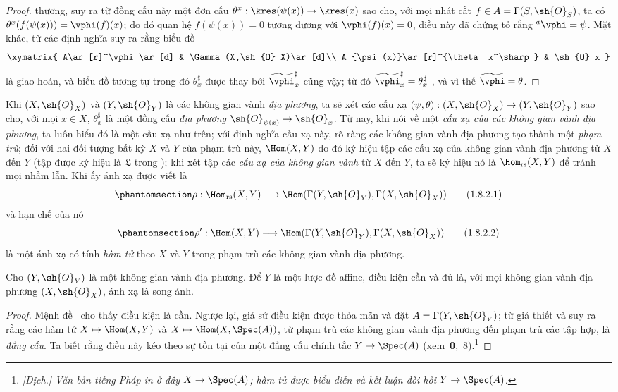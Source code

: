 \documentclass[oneside]{amsart}
\makeatletter
\newcommand{\ega@arrow}[2]{\mathchoice{#1}{#2}{#2}{#2}}
\let\ega@shortmapsto\mapsto
\renewcommand{\to}{\ega@arrow{\longrightarrow}{\rightarrow}}
\renewcommand{\mapsto}{\ega@arrow{\longmapsto}{\ega@shortmapsto}}
\newcommand{\oldpage}[2][]{{\marginnote{\normalfont\textbf{#1}~|~#2}}\ignorespaces}
\let\EGAOriginalLabel\label
\renewcommand{\label}[1]{\phantomsection\EGAOriginalLabel{#1}}
\makeatother
\begin{document}
\begin{proof}
thương, suy ra từ đồng cấu này một đơn cấu
$\theta^x:\kres(\psi(x))\to\kres(x)$ sao cho, với mọi nhát cắt
$f\in A=\Gamma(S,\sh{O}_S)$, ta có
$\theta^x(f(\psi(x)))=\vphi(f)(x)$;
do đó quan hệ $f(\psi(x))=0$ tương đương với $\vphi(f)(x)=0$, điều này
đã chứng tỏ rằng ${}^a\vphi=\psi$.
Mặt khác, từ các định nghĩa suy ra rằng biểu đồ
\[
  \xymatrix{
    A\ar[r]^\vphi\ar[d] &
    \Gamma(X,\sh{O}_X)\ar[d]\\
    A_{\psi(x)}\ar[r]^{\theta_x^\sharp} &
    \sh{O}_x
  }
\]
là giao hoán, và biểu đồ tương tự trong đó $\theta_x^\sharp$ được thay
bởi $\widetilde{\vphi}_x^\sharp$ cũng vậy; từ đó
$\widetilde{\vphi}_x^\sharp=\theta_x^\sharp$ , và vì
thế $\widetilde{\vphi}=\theta$.
\end{proof}

\begin{env}[1.8.2]
\label{I.1.8.2}
Khi $(X,\sh{O}_X)$ và $(Y,\sh{O}_Y)$ là các không gian vành
\emph{địa phương}, ta sẽ xét các cấu xạ
$(\psi,\theta):(X,\sh{O}_X)\to(Y,\sh{O}_Y)$ sao cho, với mọi
$x\in X$, $\theta_x^\sharp$ là một đồng cấu \emph{địa phương}
$\sh{O}_{\psi(x)}\to\sh{O}_x$.
Từ nay, khi nói
\oldpage[II]{219}
về một \emph{cấu xạ của các không gian vành địa phương}, ta luôn hiểu đó
là một cấu xạ như trên;
với định nghĩa cấu xạ này, rõ ràng các không gian vành địa phương tạo
thành một \emph{phạm trù};
đối với hai đối tượng bất kỳ $X$ và $Y$ của phạm trù này, $\Hom(X,Y)$ do
đó ký hiệu tập các cấu xạ của không gian vành địa phương từ $X$ đến $Y$
(tập được ký hiệu là $\mathfrak{L}$ trong );
khi xét tập các \emph{cấu xạ của không gian vành} từ $X$ đến $Y$, ta sẽ
ký hiệu nó là $\Hom_\text{rs}(X,Y)$ để tránh mọi nhầm lẫn.
Khi ấy ánh xạ  được viết là
\[
  \label{I.1.8.2.1}
  \rho:\Hom_\text{rs}(X,Y)\to\Hom(\Gamma(Y,\sh{O}_Y),\Gamma(X,\sh{O}_X))
  \tag{1.8.2.1}
\]
và hạn chế của nó
\[
  \label{I.1.8.2.2}
  \rho':\Hom(X,Y)\to\Hom(\Gamma(Y,\sh{O}_Y),\Gamma(X,\sh{O}_X))
  \tag{1.8.2.2}
\]
là một ánh xạ có tính \emph{hàm tử} theo $X$ và $Y$ trong phạm trù các
không gian vành địa phương.
\end{env}

\begin{corollary}[1.8.3]
\label{I.1.8.3}
Cho $(Y,\sh{O}_Y)$ là một không gian vành địa phương.
Để $Y$ là một lược đồ affine, điều kiện cần và đủ là, với mọi không gian
vành địa phương $(X,\sh{O}_X)$, ánh xạ  là song ánh.
\end{corollary}

\begin{proof}
Mệnh đề~ cho thấy điều kiện là cần.
Ngược lại, giả sử điều kiện được thỏa mãn và đặt
$A=\Gamma(Y,\sh{O}_Y)$;
từ giả thiết và  suy ra rằng các hàm tử
$X\mapsto\Hom(X,Y)$ và $X\mapsto\Hom(X,\Spec(A))$, từ phạm trù các không
gian vành địa phương đến phạm trù các tập hợp, là \emph{đẳng cấu}.
Ta biết rằng điều này kéo theo sự tồn tại của một đẳng cấu chính tắc
$Y\to\Spec(A)$ (xem~\textbf{0},~8).\footnote{\emph{[Dịch.] Văn bản
tiếng Pháp in ở đây $X\to\Spec(A)$; hàm tử được biểu diễn và kết luận đòi
hỏi $Y\to\Spec(A)$.}}
\end{proof}
\end{document}
